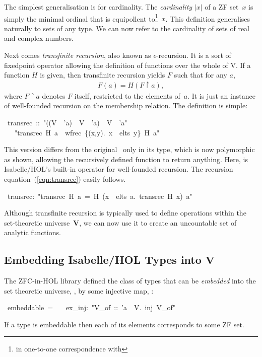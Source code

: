 \documentclass[runningheads]{llncs}
\newcommand{\V}{\mathbf{V}}
\begin{document}
The simplest generalisation is for cardinality. The \textit{cardinality} $|x|$ of a ZF set~$x$ is simply the minimal ordinal that is equipollent to\footnote{in one-to-one correspondence with}~$x$. This definition generalises naturally to sets of any type. We can now refer to the cardinality of sets of real and complex numbers.

Next comes \textit{transfinite recursion}, also known as $\epsilon$-recursion. It is a sort of fixedpoint operator allowing the definition of functions over the whole of V\@. If a function $H$ is given, then transfinite recursion yields $F$ such that for any $a$,
\begin{align}
F(a) = H (F\restriction a), \label{eqn:transrec}
\end{align}
where $F\restriction a$ denotes $F$ itself, restricted to the elements of~$a$. It is just an instance of well-founded recursion on the membership relation. The definition is simple:
\begin{isabelle}
\ transrec\ ::\ "((V\ \isasymRightarrow \ 'a)\ \isasymRightarrow \ V\ \isasymRightarrow \ 'a)\ \isasymRightarrow \ V\ \isasymRightarrow \ 'a"\isanewline
\ \ \ "transrec\ H\ a\ \isasymequiv \ wfrec\ \{(x,y).\ x\ \isasymin \ elts\ y\}\ H\ a"
\end{isabelle}
This version differs from the original~\cite{ZFC_in_HOL-AFP} only in its type, which is now polymorphic as shown, allowing the recursively defined function to return anything.
Here,  is Isabelle/HOL's built-in operator for well-founded recursion.
The recursion equation~(\ref{eqn:transrec}) easily follows.
\begin{isabelle}
\ transrec:\ "transrec\ H\ a\ =\ H\ (\isasymlambda x\ \isasymin \ elts\ a.\ transrec\ H\ x)\ a"
\end{isabelle}
Although transfinite recursion is typically used to define operations within the set-theoretic universe~$\V$, we can now use it to create an uncountable set of analytic functions.

\subsection{Embedding Isabelle/HOL Types into $\V$}

The ZFC-in-HOL library defined the class of types that can be \textit{embedded} into the set theoretic universe, , by some injective map, :
\begin{isabelle}
\ embeddable\ =\isanewline
\ \ \ ex\_inj:\ "\isasymexists V\_of\ ::\ 'a\ \isasymRightarrow \ V.\ inj\ V\_of"
\end{isabelle}
If a type is embeddable then each of its elements corresponds to some ZF set.
\end{document}
